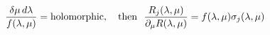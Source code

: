 \begin{equation}
{\delta \mu \,d\lambda\over f(\lambda,\mu)}   = {\rm holomorphic},\quad {\rm then~~} {R_j(\lambda,\mu) \over \partial_\mu R (\lambda,\mu) } = f(\lambda,\mu) \sigma_j(\lambda,\mu)
\label{delatmugeneral}
\end{equation}

